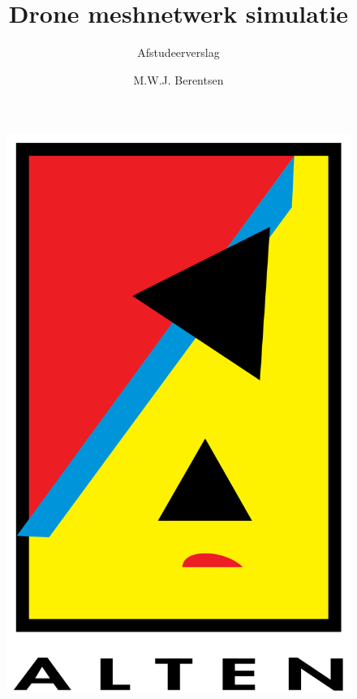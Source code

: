 \documentclass[a4paper, 11pt, oneside]{report}
\author{M.W.J. Berentsen}
\title{\myfont Drone meshnetwerk simulatie}
\subtitle{Afstudeerverslag}{HAN Arnhem}{561399}{MWJ.Berentsen@student.han.nl}{Versie 1}{Alten Nederland B.V.}{Docent: J. Visch, MSc}{Assessor: ir. C.G.R. van Uffelen}
\begin{document}
\begin{figure}
\begin{center}\includegraphics[scale=0.1]{alten}\end{center}
\end{figure}
\maketitle

\end{document}
